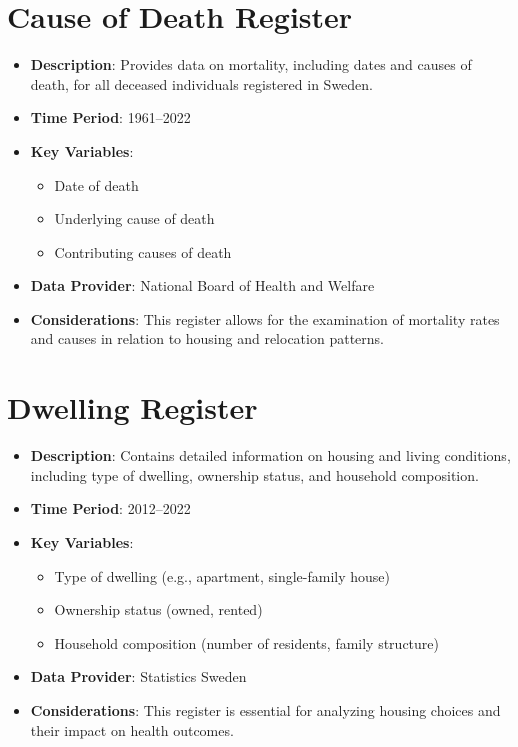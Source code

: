 \documentclass[
]{book}
\providecommand{\tightlist}{%
  \setlength{\itemsep}{0pt}\setlength{\parskip}{0pt}}
\begin{document}
\hypertarget{cause-of-death-register}{%
\section{Cause of Death Register}\label{cause-of-death-register}}

\begin{itemize}
\tightlist
\item
  \textbf{Description}: Provides data on mortality, including dates and causes of death, for all deceased individuals registered in Sweden.
\item
  \textbf{Time Period}: 1961--2022
\item
  \textbf{Key Variables}:

  \begin{itemize}
  \tightlist
  \item
    Date of death
  \item
    Underlying cause of death
  \item
    Contributing causes of death
  \end{itemize}
\item
  \textbf{Data Provider}: National Board of Health and Welfare
\item
  \textbf{Considerations}: This register allows for the examination of mortality rates and causes in relation to housing and relocation patterns.
\end{itemize}

\hypertarget{dwelling-register}{%
\section{Dwelling Register}\label{dwelling-register}}

\begin{itemize}
\tightlist
\item
  \textbf{Description}: Contains detailed information on housing and living conditions, including type of dwelling, ownership status, and household composition.
\item
  \textbf{Time Period}: 2012--2022
\item
  \textbf{Key Variables}:

  \begin{itemize}
  \tightlist
  \item
    Type of dwelling (e.g., apartment, single-family house)
  \item
    Ownership status (owned, rented)
  \item
    Household composition (number of residents, family structure)
  \end{itemize}
\item
  \textbf{Data Provider}: Statistics Sweden
\item
  \textbf{Considerations}: This register is essential for analyzing housing choices and their impact on health outcomes.
\end{itemize}
\end{document}
